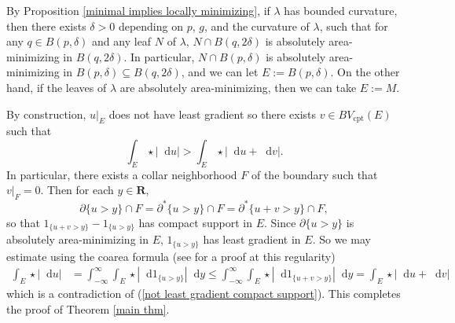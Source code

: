 \documentclass[reqno,11pt]{amsart}
\newcommand{\RR}{\mathbf{R}}
\newcommand*\dif{\mathop{}\!\mathrm{d}}
\newcommand{\cpt}{\mathrm{cpt}}
\theoremstyle{definition}
\numberwithin{equation}{section}
\begin{document}
By Proposition \ref{minimal implies locally minimizing}, if $\lambda$ has bounded curvature, then there exists $\delta > 0$ depending on $p$, $g$, and the curvature of $\lambda$, such that for any $q \in B(p, \delta)$ and any leaf $N$ of $\lambda$, $N \cap B(q, 2\delta)$ is absolutely area-minimizing in $B(q, 2\delta)$.
In particular, $N \cap B(p, \delta)$ is absolutely area-minimizing in $B(p, \delta) \subseteq B(q, 2\delta)$, and we can let $E := B(p, \delta)$.
On the other hand, if the leaves of $\lambda$ are absolutely area-minimizing, then we can take $E := M$.

By construction, $u|_E$ does not have least gradient so there exists $v \in BV_\cpt(E)$ such that
\begin{equation}\label{not least gradient compact support}
\int_E \star |\dif u| > \int_E \star |\dif u + \dif v|.
\end{equation}
In particular, there exists a collar neighborhood $F$ of the boundary such that $v|_F = 0$.
Then for each $y \in \RR$,
$$\partial \{u > y\} \cap F = \partial^* \{u > y\} \cap F = \partial^* \{u + v > y\} \cap F,$$
so that $1_{\{u + v > y\}} - 1_{\{u > y\}}$ has compact support in $E$.
Since $\partial \{u > y\}$ is absolutely area-minimizing in $E$, $1_{\{u > y\}}$ has least gradient in $E$.
So we may estimate using the coarea formula (see \cite[Proposition 2.5]{BackusFLG} for a proof at this regularity)
\begin{align*}
\int_E \star |\dif u| &= \int_{-\infty}^\infty \int_E \star |\dif 1_{\{u > y\}}| \dif y \leq \int_{-\infty}^\infty \int_E \star |\dif 1_{\{u + v > y\}}| \dif y = \int_E \star |\dif u + \dif v|
\end{align*}
which is a contradiction of (\ref{not least gradient compact support}).
This completes the proof of Theorem \ref{main thm}.


\end{document}
